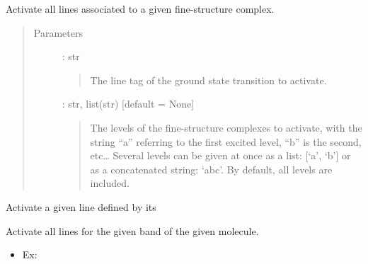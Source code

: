 \documentclass[letterpaper,10pt,english]{sphinxmanual}
\begin{document}
\begin{fulllineitems}
\begin{fulllineitems}
\end{fulllineitems}


\begin{fulllineitems}
\label{\detokenize{api:VoigtFit.DataSet.activate_fine_lines}}
Activate all lines associated to a given fine-structure complex.
\begin{quote}\begin{description}
\item[{Parameters}] \leavevmode
{} : str
\begin{quote}

The line tag of the ground state transition to activate.
\end{quote}

 : str, list(str)   {[}default = None{]}
\begin{quote}

The levels of the fine-structure complexes to activate,
with the string “a” referring to the first excited level,
“b” is the second, etc…
Several levels can be given at once as a list: {[}‘a’, ‘b’{]}
or as a concatenated string: ‘abc’.
By default, all levels are included.
\end{quote}

\end{description}\end{quote}

\end{fulllineitems}


\begin{fulllineitems}
\label{\detokenize{api:VoigtFit.DataSet.activate_line}}
Activate a given line defined by its 

\end{fulllineitems}


\begin{fulllineitems}
\label{\detokenize{api:VoigtFit.DataSet.activate_molecule}}
Activate all lines for the given band of the given molecule.
\begin{itemize}
\item {} 
Ex: 


\end{itemize}
\end{fulllineitems}
\end{fulllineitems}
\end{document}
